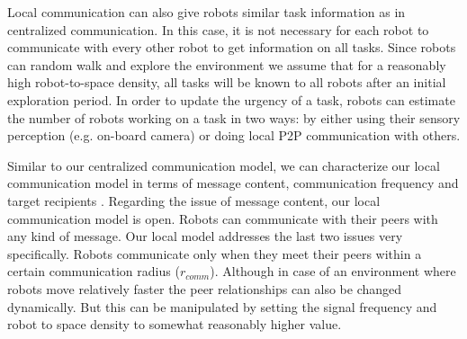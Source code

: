 \documentclass[journal]{IEEEtran}
\begin{document}
Local communication can also give robots similar task information as in centralized communication. In this case, it is not necessary for each robot to communicate with every other robot to get information on all tasks. Since robots can random walk and explore the environment we assume that for a reasonably high robot-to-space density, all tasks will be known to all robots after an initial exploration period. In order to update the urgency of a task, robots can estimate the number of robots working on a task in two ways:  by either using their sensory perception (e.g. on-board camera) or  doing local P2P communication with others.

Similar to our centralized communication model, we can characterize our local communication model in terms of message content, communication frequency and target recipients \cite{Gerkey+2001}. Regarding the issue of message content, our local communication model is open. Robots can communicate with their peers with any kind of message. Our local model addresses the last two issues very specifically. Robots communicate only when they meet their peers within a certain communication radius ($r_{comm}$). Although in case of an environment where robots move relatively faster the peer relationships can also be changed dynamically. But this can be manipulated by setting the signal frequency and robot to space density to somewhat reasonably higher value.
\end{document}
